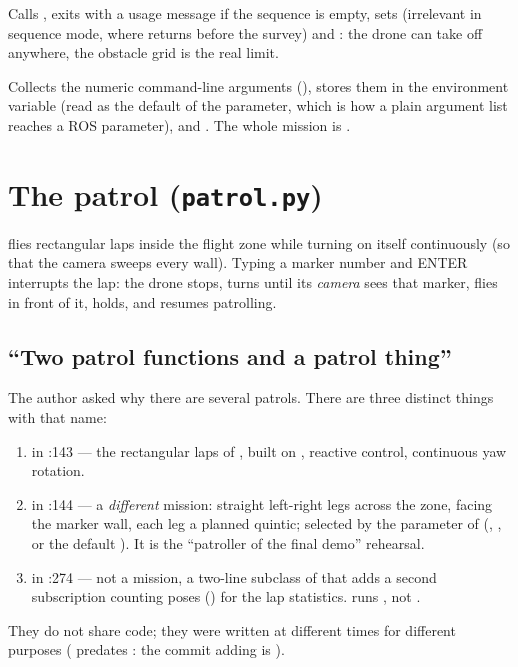 Calls , exits with a usage message if the sequence is empty, sets
 (irrelevant in sequence mode, where  returns before the survey) and
: the drone can take off anywhere, the obstacle grid is the real limit.

Collects the numeric command-line arguments (), stores them in the environment variable
 (read as the default of the  parameter, which is how a plain argument list reaches
a ROS parameter), and . The whole mission is .

\section{The patrol (\texorpdfstring{\texttt{patrol.py}}{patrol.py})}

 flies rectangular laps inside the flight zone while turning on itself continuously (so that the
camera sweeps every wall). Typing a marker number and ENTER interrupts the lap: the drone stops, turns until its
\emph{camera} sees that marker, flies in front of it, holds, and resumes patrolling.

\subsection{``Two patrol functions and a patrol thing''}

The author asked why there are several patrols. There are three distinct things with that name:
\begin{enumerate}[nosep]
  \item {} in :143 --- the rectangular laps of , built on
        , reactive control, continuous yaw rotation.
  \item {} in :144 --- a \emph{different} mission: straight left-right legs
        across the zone, facing the marker wall, each leg a planned quintic; selected by the 
        parameter of  (, , or the default
        ). It is the ``patroller of the final demo'' rehearsal.
  \item {} in :274 --- not a mission, a two-line subclass of  that adds
        a second  subscription counting poses () for the lap statistics.
         runs , not .
\end{enumerate}
They do not share code; they were written at different times for different purposes ( predates
: the commit adding  is ).

